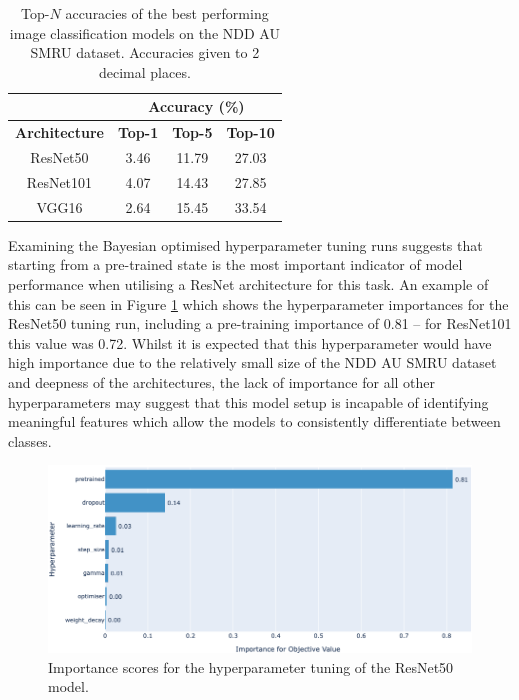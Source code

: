 \begin{table}[]
	\centering
	\small
		\begin{tabular}{cccc}
			\cline{2-4}
			 & \multicolumn{3}{c}{\textbf{Accuracy (\%)}} \\ \hline
			\textbf{Architecture}                    &  \textbf{Top-1} & \textbf{Top-5} & \textbf{Top-10} \\ \hline
			ResNet50 \cite{he_deep_2015}   &  3.46                 & 11.79            & 27.03                  \\
			ResNet101 \cite{he_deep_2015}   &  4.07                  &   14.43               &  27.85                     \\
			VGG16 \cite{simonyan_very_2015} & 2.64                &    15.45              &   33.54     \\\bottomrule
	\end{tabular}
	\caption[Top-$N$ accuracies of the best performing image classification models on the NDD AU SMRU dataset.]{Top-$N$ accuracies of the best performing image classification models on the NDD AU SMRU dataset. Accuracies given to 2 decimal places.}
	\label{tab:optunaBestParamsStandard}
\end{table}

Examining the Bayesian optimised hyperparameter tuning runs suggests that starting from a pre-trained state is the most important indicator of model performance when utilising a ResNet architecture for this task. An example of this can be seen in Figure \ref{fig:resnet50baseline-hyperparam-importance-optuna} which shows the hyperparameter importances for the ResNet50 tuning run, including a pre-training importance of 0.81 -- for ResNet101 this value was 0.72. Whilst it is expected that this hyperparameter would have high importance due to the relatively small size of the NDD AU SMRU dataset and deepness of the architectures, the lack of importance for all other hyperparameters may suggest that this model setup is incapable of identifying meaningful features which allow the models to consistently differentiate between classes. 

\begin{figure}
	\begin{center}
		\includegraphics[scale=0.4]{Chapter6/figs/resnet50baseline-hyperparam-importance-optuna-updated.png}
	\end{center}
	\caption{Importance scores for the hyperparameter tuning of the ResNet50 model.}
	\label{fig:resnet50baseline-hyperparam-importance-optuna}
\end{figure}

